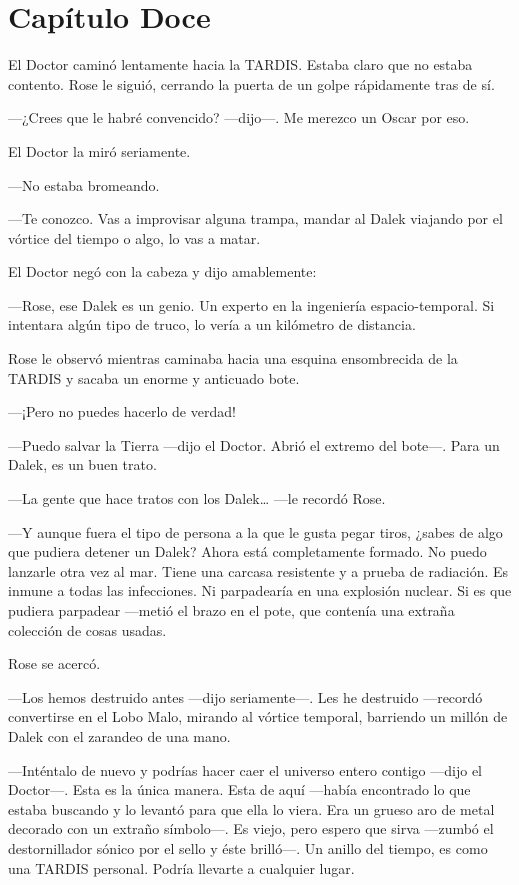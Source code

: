 \chapter*{Capítulo Doce}

El Doctor caminó lentamente hacia la TARDIS. Estaba claro que no estaba
contento. Rose le siguió, cerrando la puerta de un golpe rápidamente
tras de sí.

---¿Crees que le habré convencido? ---dijo---. Me merezco un Oscar por eso.

El Doctor la miró seriamente.

---No estaba bromeando.

---Te conozco. Vas a improvisar alguna trampa, mandar al Dalek viajando
por el vórtice del tiempo o algo, lo vas a matar.

El Doctor negó con la cabeza y dijo amablemente:

---Rose, ese Dalek es un genio. Un experto en la ingeniería
espacio-temporal. Si intentara algún tipo de truco, lo vería a un
kilómetro de distancia.

Rose le observó mientras caminaba hacia una esquina ensombrecida de la
TARDIS y sacaba un enorme y anticuado bote.

---¡Pero no puedes hacerlo de verdad!

---Puedo salvar la Tierra ---dijo el Doctor. Abrió el extremo del bote---.
Para un Dalek, es un buen trato.

---La gente que hace tratos con los Dalek\ldots{} ---le recordó Rose.

---Y aunque fuera el tipo de persona a la que le gusta pegar tiros,
¿sabes de algo que pudiera detener un Dalek? Ahora está completamente
formado. No puedo lanzarle otra vez al mar. Tiene una carcasa resistente
y a prueba de radiación. Es inmune a todas las infecciones. Ni
parpadearía en una explosión nuclear. Si es que pudiera parpadear
---metió el brazo en el pote, que contenía una extraña colección de cosas
usadas.

Rose se acercó.

---Los hemos destruido antes ---dijo seriamente---. Les he destruido
---recordó convertirse en el Lobo Malo, mirando al vórtice temporal,
barriendo un millón de Dalek con el zarandeo de una mano.

---Inténtalo de nuevo y podrías hacer caer el universo entero contigo
---dijo el Doctor---. Esta es la única manera. Esta de aquí ---había
encontrado lo que estaba buscando y lo levantó para que ella lo viera.
Era un grueso aro de metal decorado con un extraño símbolo---. Es viejo,
pero espero que sirva ---zumbó el destornillador sónico por el sello y
éste brilló---. Un anillo del tiempo, es como una TARDIS personal. Podría
llevarte a cualquier lugar.

